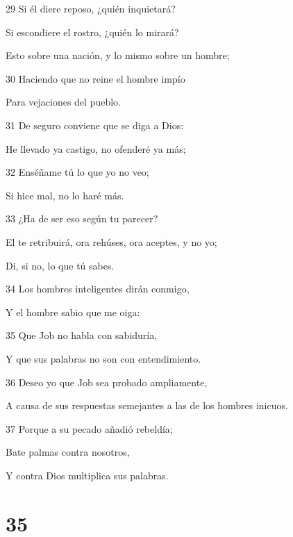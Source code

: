 \par 29 Si él diere reposo, ¿quién inquietará?
\par Si escondiere el rostro, ¿quién lo mirará?
\par Esto sobre una nación, y lo mismo sobre un hombre;
\par 30 Haciendo que no reine el hombre impío
\par Para vejaciones del pueblo.
\par 31 De seguro conviene que se diga a Dios:
\par He llevado ya castigo, no ofenderé ya más;
\par 32 Enséñame tú lo que yo no veo;
\par Si hice mal, no lo haré más.
\par 33 ¿Ha de ser eso según tu parecer?
\par El te retribuirá, ora rehúses, ora aceptes, y no yo;
\par Di, si no, lo que tú sabes.
\par 34 Los hombres inteligentes dirán conmigo,
\par Y el hombre sabio que me oiga: 
\par 35 Que Job no habla con sabiduría,
\par Y que sus palabras no son con entendimiento.
\par 36 Deseo yo que Job sea probado ampliamente,
\par A causa de sus respuestas semejantes a las de los hombres inicuos.
\par 37 Porque a su pecado añadió rebeldía;
\par Bate palmas contra nosotros,
\par Y contra Dios multiplica sus palabras.

\chapter{35}

